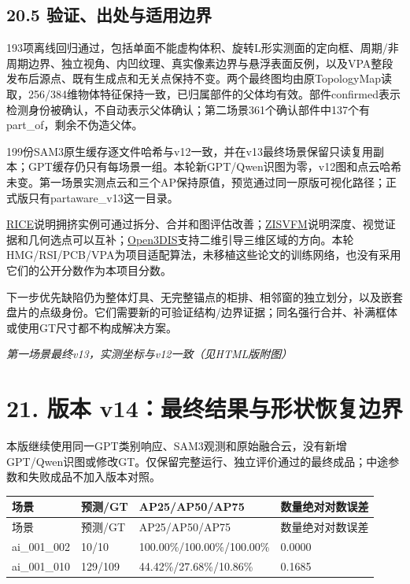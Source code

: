 \documentclass[UTF8,fontset=fandol]{ctexart}
\begin{document}
\subsection*{20.5 验证、出处与适用边界}

193项离线回归通过，包括单面不能虚构体积、旋转L形实测面的定向框、周期/非周期边界、独立视角、内凹纹理、真实像素边界与悬浮表面反例，以及VPA整段发布后源点、既有生成点和无关点保持不变。两个最终图均由原TopologyMap读取，256/384维物体特征保持一致，已归属部件的父体均有效。部件confirmed表示检测身份被确认，不自动表示父体确认；第二场景361个确认部件中137个有part\_of，剩余不伪造父体。



199份SAM3原生缓存逐文件哈希与v12一致，并在v13最终场景保留只读复用副本；GPT缓存仍只有每场景一组。本轮新GPT/Qwen识图为零，v12图和点云哈希未变。第一场景实测点云和三个AP保持原值，预览通过同一原版可视化路径；正式版只有partaware\_v13这一目录。



\href{https://arxiv.org/abs/2106.15711}{RICE}说明拥挤实例可通过拆分、合并和图评估改善；\href{https://arxiv.org/abs/2502.03266}{ZISVFM}说明深度、视觉证据和几何选点可以互补；\href{https://arxiv.org/abs/2312.10671}{Open3DIS}支持二维引导三维区域的方向。本轮HMG/RSI/PCB/VPA为项目适配算法，未移植这些论文的训练网络，也没有采用它们的公开分数作为本项目分数。



下一步优先缺陷仍为整体灯具、无完整锚点的柜排、相邻窗的独立划分，以及嵌套盘片的点级身份。它们需要新的可验证结构/边界证据；同名强行合并、补满框体或使用GT尺寸都不构成解决方案。



\textit{第一场景最终v13，实测坐标与v12一致（见HTML版附图）}



\section*{21. 版本 v14：最终结果与形状恢复边界}

本版继续使用同一GPT类别响应、SAM3观测和原始融合云，没有新增GPT/Qwen识图或修改GT。仅保留完整运行、独立评价通过的最终成品；中途参数和失败成品不加入版本对照。



{\small
\begin{longtable}{|p{}|p{}|p{}|p{}|}
\hline
场景 & 预测/GT & AP25/AP50/AP75 & 数量绝对对数误差 \\ \hline
\endfirsthead
\hline
场景 & 预测/GT & AP25/AP50/AP75 & 数量绝对对数误差 \\ \hline
\endhead
ai\_001\_002 & 10/10 & 100.00\%/100.00\%/100.00\% & 0.0000 \\ \hline
ai\_001\_010 & 129/109 & 44.42\%/27.68\%/10.86\% & 0.1685 \\ \hline
\end{longtable}
}
\end{document}
